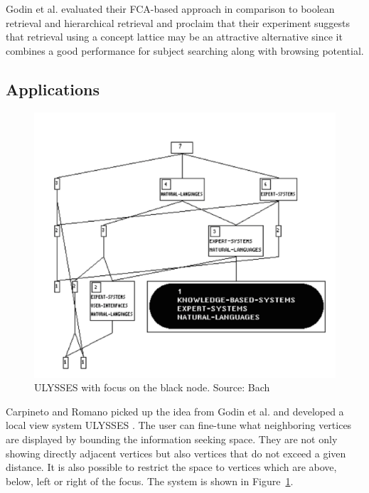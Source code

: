 \documentclass[11pt]{report}
\begin{document}
Godin et al. \cite{Godin1993} evaluated their FCA-based approach in comparison to boolean retrieval and hierarchical retrieval and proclaim that their experiment suggests that retrieval using a concept lattice may be an attractive alternative since it combines a good performance for subject searching along with browsing potential.

\subsection{Applications}

\begin{figure}[!ht]
	\centering
	\includegraphics[width=\linewidth]{images/ulysses}
\caption{ULYSSES with focus on the black node. Source: Bach \cite{Bach2010} }
\label{figure:ulysses}
\end{figure}

Carpineto and Romano picked up the idea from Godin et al. and developed a local view system ULYSSES \cite{Carpineto1995,Carpineto1996}. The user can fine-tune what neighboring vertices are displayed by bounding the information seeking space. They are not only showing directly adjacent vertices but also vertices that do not exceed a given distance. It is also possible to restrict the space to vertices which are above, below, left or right of the focus. The system is shown in Figure~\ref{figure:ulysses}. \\
\end{document}
